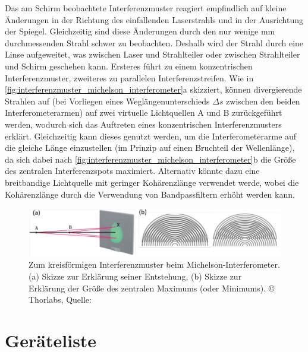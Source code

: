 \documentclass[ngerman]{scrartcl}
\begin{document}
Das am Schirm beobachtete Interferenzmuster reagiert empfindlich auf kleine Änderungen in der Richtung des einfallenden Laserstrahls und in der Ausrichtung der Spiegel. Gleichzeitig sind diese Änderungen durch den nur wenige mm durchmessenden Strahl schwer zu beobachten. Deshalb wird der Strahl durch eine Linse aufgeweitet, was zwischen Laser und Strahlteiler oder zwischen Strahlteiler und Schirm geschehen kann. Ersteres führt zu einem konzentrischen Interferenzmuster, zweiteres zu parallelen Interferenzstreifen. Wie in \autoref{fig:interferenzmuster_michelson_interferometer}a skizziert, können divergierende Strahlen auf (bei Vorliegen eines Weglängenunterschieds $\Delta s$ zwischen den beiden Interferometerarmen) auf zwei virtuelle Lichtquellen A und B zurückgeführt werden, wodurch sich das Auftreten eines konzentrischen Interferenzmusters erklärt. Gleichzeitig kann dieses genutzt werden, um die Interferometerarme auf die gleiche Länge einzustellen (im Prinzip auf einen Bruchteil der Wellenlänge), da sich dabei nach \autoref{fig:interferenzmuster_michelson_interferometer}b die Größe des zentralen Interferenzspots maximiert. Alternativ könnte dazu eine breitbandige Lichtquelle mit geringer Kohärenzlänge verwendet werde, wobei die Kohärenzlänge durch die Verwendung von Bandpassfiltern erhöht werden kann.

\begin{figure}[H]
    \centering
    \begin{samepage}
        \includegraphics[width=\linewidth]{fig/Angabe_Abb9.png}
        \caption[Interferenzmuster Michelson-Interferometer]{Zum kreisförmigen Interferenzmuster beim Michelson-Interferometer. (a) Skizze zur Erklärung seiner Entstehung, (b) Skizze zur Erklärung der Größe des zentralen Maximums (oder Minimums). \copyright{} Thorlabs, Quelle: \cite{ref:angabe}}
        \label{fig:interferenzmuster_michelson_interferometer}
    \end{samepage}
\end{figure}

\clearpage

\section{Geräteliste}
\label{sec:geraeteliste}
\end{document}
